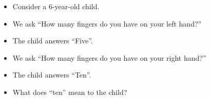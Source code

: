 %
%

\begin{frame}
  \begin{example}
    \begin{itemize}
      \item Consider a 6-year-old child.
      \item We ask \enquote{How many fingers do you have on your left hand?}
      \item The child answers \enquote{Five}.
      \item We ask \enquote{How many fingers do you have on your right hand?}
      \item The child answers \enquote{Ten}.
    \end{itemize}
  \end{example}

  \pause

  \begin{remark}
    \begin{itemize}
      \item What does \enquote{ten} mean to the child?
    \end{itemize}
  \end{remark}
\end{frame}

